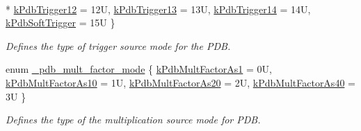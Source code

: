 \begin{DoxyCompactItemize}
\\*
\hyperlink{group__pdb__hal_gga436ffb28ac0668778b62d7e380815cb9ace68ee8a3848d5d4fcfb51c17db8be25}{k\+Pdb\+Trigger12} = 12U, 
\hyperlink{group__pdb__hal_gga436ffb28ac0668778b62d7e380815cb9af014a0b070deb26383adb72ed4fc3227}{k\+Pdb\+Trigger13} = 13U, 
\hyperlink{group__pdb__hal_gga436ffb28ac0668778b62d7e380815cb9ac22d9dc94b8faeae85dbbf53e43f674a}{k\+Pdb\+Trigger14} = 14U, 
\hyperlink{group__pdb__hal_gga436ffb28ac0668778b62d7e380815cb9a05b38b4e6f5b74b8cf1ab3ea0ff27e54}{k\+Pdb\+Soft\+Trigger} = 15U
 \}\begin{DoxyCompactList}\small\item\em Defines the type of trigger source mode for the P\+DB. \end{DoxyCompactList}
\item 
enum \hyperlink{group__pdb__hal_gae87b5a0cf111784453bd0090c1a05254}{\+\_\+pdb\+\_\+mult\+\_\+factor\+\_\+mode} \{ \hyperlink{group__pdb__hal_ggae87b5a0cf111784453bd0090c1a05254a5b0fbc4cbb169d1e904a6028e464c3a5}{k\+Pdb\+Mult\+Factor\+As1} = 0U, 
\hyperlink{group__pdb__hal_ggae87b5a0cf111784453bd0090c1a05254adf5e8b02d6cb032d3c5158fba1249f5a}{k\+Pdb\+Mult\+Factor\+As10} = 1U, 
\hyperlink{group__pdb__hal_ggae87b5a0cf111784453bd0090c1a05254ab045fefa8a71122211b4c02a1f0717a0}{k\+Pdb\+Mult\+Factor\+As20} = 2U, 
\hyperlink{group__pdb__hal_ggae87b5a0cf111784453bd0090c1a05254a3a91ab697bf34c36f70a8496fde8d37b}{k\+Pdb\+Mult\+Factor\+As40} = 3U
 \}\begin{DoxyCompactList}\small\item\em Defines the type of the multiplication source mode for P\+DB. \end{DoxyCompactList}
\end{DoxyCompactItemize}
